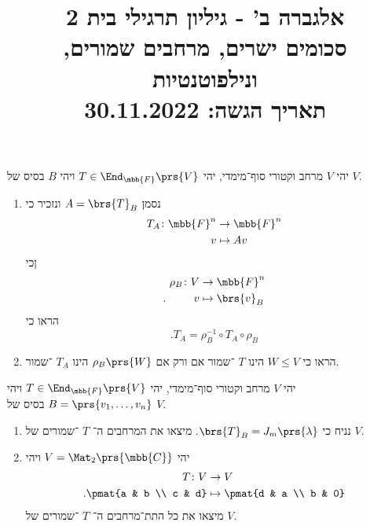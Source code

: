 \documentclass[a4paper,10pt,twoside,openany]{article}
\title{
אלגברה ב' - גיליון תרגילי בית 2 \\
סכומים ישרים, מרחבים שמורים, ונילפוטנטיות
\\
\vspace{1cm}
\large{תאריך הגשה: 30.11.2022}
}
\date{}
\begin{document}
\maketitle

\begin{exercise}
יהי
$V$
מרחב וקטורי סוף־מימדי, יהי
$T \in \End_{\mbb{F}}\prs{V}$
ויהי
$B$
בסיס של
$V$.

\begin{enumerate}
\item נסמן
$A = \brs{T}_B$
ונזכיר כי
\begin{align*}
T_A \colon \mbb{F}^n &\to \mbb{F}^n \\
v &\mapsto Av
\end{align*}
ןכי
\begin{align*}
\rho_B \colon V &\to \mbb{F}^n \\
\text{.} \hphantom{lalala} v &\mapsto \brs{v}_B
\end{align*}
הראו כי
\[\text{.} T_A = \rho_B^{-1} \circ T_A \circ \rho_B\]

\item
הראו כי
$W \leq V$
הינו
$T$%
־שמור אם ורק אם
$\rho_B\prs{W}$
הינו
$T_A$%
־שמור.
\end{enumerate}
\end{exercise}

\begin{exercise}
יהי
$V$
מרחב וקטורי סוף־מימדי, יהי
$T \in \End_{\mbb{F}}\prs{V}$
ויהי
$B = \prs{v_1, \ldots, v_n}$
בסיס של
$V$.
\begin{enumerate}
\item נניח כי
$\brs{T}_B = J_m\prs{\lambda}$.
מיצאו את המרחבים ה־%
$T$%
־שמורים של
$V$.

\item
יהי
$V = \Mat_2\prs{\mbb{C}}$
ויהי
\begin{align*}
T \colon V &\to V \\
\text{.} \pmat{a & b \\ c & d} &\mapsto \pmat{d & a \\ b & 0}
\end{align*}
מיצאו את כל התת־מרחבים ה־%
$T$%
־שמורים של
$V$.
\end{enumerate}
\end{exercise}
\end{document}
